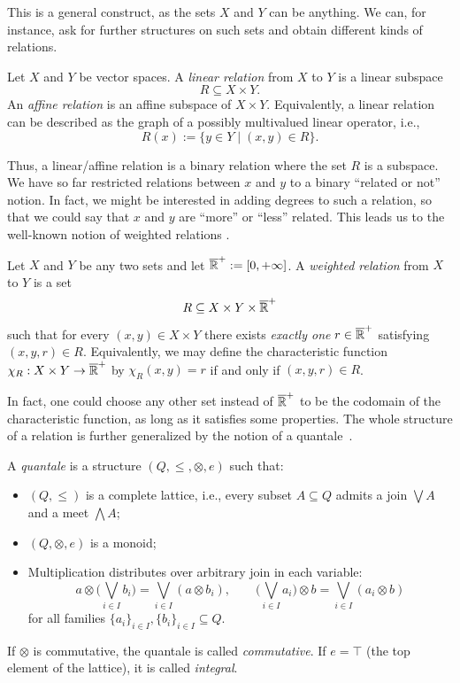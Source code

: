 This is a general construct, as the sets $X$ and $Y$ can be anything.
We can, for instance, ask for further structures on such sets and obtain different kinds of relations.
\begin{definition}
	Let $X$ and $Y$ be vector spaces. A \emph{linear relation} from $X$ to $Y$ is a linear subspace
	\[
		R \subseteq X \times Y.
	\]
	An \emph{affine relation} is an affine subspace of $X \times Y$.
	Equivalently, a linear relation can be described as the graph of a possibly multivalued linear operator, i.e.,
	\[
		R(x) := \{ y \in Y \mid (x,y) \in R \}.
	\]
\end{definition}

Thus, a linear/affine relation is a binary relation where the set $R$ is a subspace.
We have so far restricted relations between $x$ and $y$ to a binary ``related or not'' notion. In fact, we might be interested in adding degrees to such a relation, so that we could say that $x$ and $y$ are ``more'' or ``less'' related. This leads us to the well-known notion of weighted relations \cite{lawvere1973metric}.

\begin{definition}
	Let $X$ and $Y$ be any two sets and let $\overline{\mathbb{R}}^+:= [0, +\infty]$.
	A \emph{weighted relation} from $X$ to $Y$ is a set
	\[
		R \subseteq X \times Y \times \overline{\mathbb{R}}^+
	\]
	such that for every $(x,y) \in X \times Y$ there exists \emph{exactly one}
	$r \in \overline{\mathbb{R}}^+$ satisfying $(x,y,r) \in R$.
	Equivalently, we may define the characteristic function
	$\chi_R : X \times Y \to \overline{\mathbb{R}}^+$
	by $\chi_R(x,y) = r$ if and only if $(x,y,r) \in R$.
\end{definition}

In fact, one could choose any other set instead of $\overline{\mathbb{R}}^+$ to be the codomain of the characteristic function, as long as it satisfies some properties. The whole structure of a relation is further generalized by the notion of a quantale~\cite{rosenthal1990quantales}.
\begin{definition}[Quantale]
	A \emph{quantale} is a structure $(Q,\leq,\otimes,e)$ such that:
	\begin{itemize}
		\item $(Q,\leq)$ is a complete lattice, i.e., every subset $A \subseteq Q$ admits a join $\bigvee A$ and a meet $\bigwedge A$;
		\item $(Q,\otimes,e)$ is a monoid;
		\item Multiplication distributes over arbitrary join in each variable:
		      \[
			      a \otimes \Big( \bigvee_{i \in I} b_i \Big)
			      =
			      \bigvee_{i \in I} (a \otimes b_i),
			      \qquad
			      \Big( \bigvee_{i \in I} a_i \Big) \otimes b
			      =
			      \bigvee_{i \in I} (a_i \otimes b)
		      \]
		      for all families $\{a_i\}_{i\in I}, \{b_i\}_{i\in I} \subseteq Q$.
	\end{itemize}
	If $\otimes$ is commutative, the quantale is called \emph{commutative}.
	If $e = \top$ (the top element of the lattice), it is called \emph{integral}.
\end{definition}

